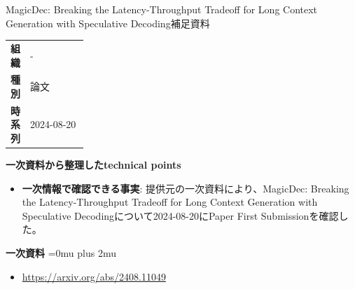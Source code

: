 \begin{technicalnote}{MagicDec: Breaking the Latency-Throughput Tradeoff for Long Context Generation with Speculative Decoding}{補足資料}
\begingroup
\begin{tabularx}{\linewidth}{@{}>{\bfseries}p{0.22\linewidth}X@{}}
組織 & - \\
種別 & 論文 \\
時系列 & 2024-08-20 \\
\end{tabularx}
\smallskip
{\bfseries 一次資料から整理したtechnical points}
\begin{itemize}[leftmargin=1.5em,itemsep=0.35em]
\item \textbf{一次情報で確認できる事実}: 提供元の一次資料により、MagicDec: Breaking the Latency-Throughput Tradeoff for Long Context Generation with Speculative Decodingについて2024-08-20にPaper First Submissionを確認した。
\end{itemize}
\begin{minipage}{\linewidth}
\begin{samepage}
{\bfseries 一次資料}
\begingroup\sloppy
\Urlmuskip=0mu plus 2mu\relax
\begin{itemize}[leftmargin=1.5em,itemsep=0.25em]
\item {\scriptsize\url{https://arxiv.org/abs/2408.11049}}
\end{itemize}
\endgroup
\end{samepage}
\end{minipage}
\endgroup
\end{technicalnote}
\medskip

